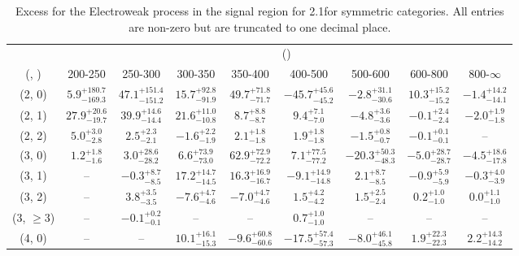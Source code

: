 \begin{table}[h!]
\tiny
\centering
\caption{Excess for the Electroweak process in the signal region for 2.1\ifb for symmetric categories. All entries are non-zero but are truncated to one decimal place.\label{tab:excesssepnaive_sig_ewk_sym}}
\begin{tabular}
{ccccccccc}
	\hline\hline
	& \multicolumn{8}{c}{\scalht (\gev)} \\ 
	 (\njet,  \nb) & 200-250 & 250-300 & 300-350 & 350-400 & 400-500 & 500-600 & 600-800 & 800-$\infty$ \\ [0.8ex] 
\hline
	(2, 0) & $5.9^{+ 180.7 }_{- 169.3 }$ & $47.1^{+ 151.4 }_{- 151.2 }$ & $15.7^{+ 92.8 }_{- 91.9 }$ & $49.7^{+ 71.8 }_{- 71.7 }$ & $-45.7^{+ 45.6 }_{- 45.2 }$ & $-2.8^{+ 31.1 }_{- 30.6 }$ & $10.3^{+ 15.2 }_{- 15.2 }$ & $-1.4^{+ 14.2 }_{- 14.1 }$ \\[0.5ex] 
	(2, 1) & $27.9^{+ 20.6 }_{- 19.7 }$ & $39.9^{+ 14.6 }_{- 14.4 }$ & $21.6^{+ 11.0 }_{- 10.8 }$ & $8.7^{+ 8.8 }_{- 8.7 }$ & $9.4^{+ 7.1 }_{- 7.0 }$ & $-4.8^{+ 3.6 }_{- 3.6 }$ & $-0.1^{+ 2.4 }_{- 2.4 }$ & $-2.0^{+ 1.9 }_{- 1.8 }$ \\[0.5ex] 
	(2, 2) & $5.0^{+ 3.0 }_{- 2.8 }$ & $2.5^{+ 2.3 }_{- 2.1 }$ & $-1.6^{+ 2.2 }_{- 1.9 }$ & $2.1^{+ 1.8 }_{- 1.8 }$ & $1.9^{+ 1.8 }_{- 1.8 }$ & $-1.5^{+ 0.8 }_{- 0.7 }$ & $-0.1^{+ 0.1 }_{- 0.1 }$ & -- \\[0.5ex] 
	(3, 0) & $1.2^{+ 1.8 }_{- 1.6 }$ & $3.0^{+ 28.6 }_{- 28.2 }$ & $6.6^{+ 73.9 }_{- 73.0 }$ & $62.9^{+ 72.9 }_{- 72.2 }$ & $7.1^{+ 77.5 }_{- 77.2 }$ & $-20.3^{+ 50.3 }_{- 48.3 }$ & $-5.0^{+ 28.7 }_{- 28.7 }$ & $-4.5^{+ 18.6 }_{- 17.8 }$ \\[0.5ex] 
	(3, 1) & -- & $-0.3^{+ 8.7 }_{- 8.5 }$ & $17.2^{+ 14.7 }_{- 14.5 }$ & $16.3^{+ 16.9 }_{- 16.7 }$ & $-9.1^{+ 14.9 }_{- 14.8 }$ & $2.1^{+ 8.7 }_{- 8.5 }$ & $-0.9^{+ 5.9 }_{- 5.9 }$ & $-0.3^{+ 4.0 }_{- 3.9 }$ \\[0.5ex] 
	(3, 2) & -- & $3.8^{+ 3.5 }_{- 3.5 }$ & $-7.6^{+ 4.7 }_{- 4.6 }$ & $-7.0^{+ 4.7 }_{- 4.6 }$ & $1.5^{+ 4.2 }_{- 4.2 }$ & $1.5^{+ 2.5 }_{- 2.4 }$ & $0.2^{+ 1.0 }_{- 1.0 }$ & $0.0^{+ 1.1 }_{- 1.0 }$ \\[0.5ex] 
	(3, $\ge3$) & -- & $-0.1^{+ 0.2 }_{- 0.1 }$ & -- & -- & $0.7^{+ 1.0 }_{- 1.0 }$ & -- & -- & -- \\[0.5ex] 
	(4, 0) & -- & -- & $10.1^{+ 16.1 }_{- 15.3 }$ & $-9.6^{+ 60.8 }_{- 60.6 }$ & $-17.5^{+ 57.4 }_{- 57.3 }$ & $-8.0^{+ 46.1 }_{- 45.8 }$ & $1.9^{+ 22.3 }_{- 22.3 }$ & $2.2^{+ 14.3 }_{- 14.2 }$ \\[0.5ex] 

\end{tabular}
\end{table}
